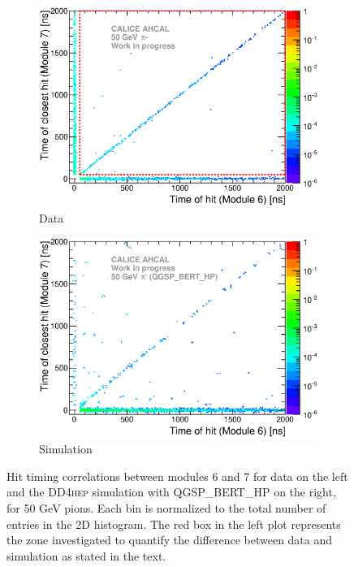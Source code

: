 \documentclass[a4paper]{article}
\newcommand\ddhep{\textsc{DD4hep}\xspace}
\begin{document}
\begin{figure}[htbp!]
  \begin{subfigure}[t]{0.49\textwidth}
    \centering
    \includegraphics[width=1\textwidth]{../Draft/fig/Time_Correlation_short.eps}
    \caption{Data} \label{fig:TimeCorr_Data_short_50GeV}
  \end{subfigure}
  \hfill
  \begin{subfigure}[t]{0.49\textwidth}
    \centering
    \includegraphics[width=1\textwidth]{../Draft/fig/Time_Correlation_50GeV_short_QGSPBERTHP_DD4hep.eps}
    \caption{Simulation} \label{fig:TimeCorr_Data_short_50GeV_Sim}
  \end{subfigure}
  \caption{Hit timing correlations between modules 6 and 7 for data on the left and the \ddhep simulation with QGSP\_BERT\_HP on the right, for 50 GeV pions. Each bin is normalized to the total number of entries in the 2D histogram. The red box in the left plot represents the zone investigated to quantify the difference between data and simulation as stated in the text.}
  \label{fig:TimeCorr_short_50GeV}
\end{figure}
\end{document}
